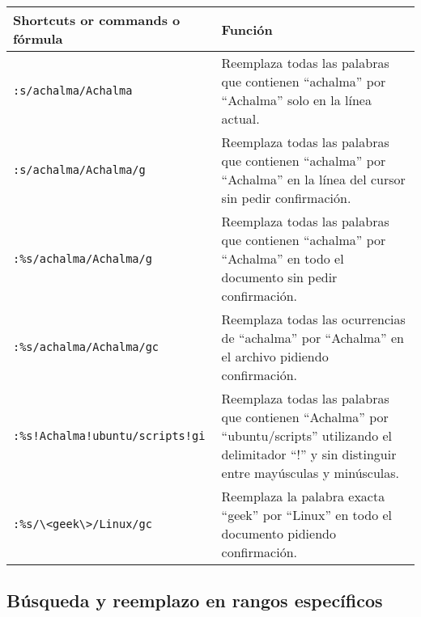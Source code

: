 \documentclass[
  doc,
  floatsintext,
  longtable,
  a4paper,
  nolmodern,
  notxfonts,
  notimes,
  colorlinks=true,linkcolor=blue,citecolor=blue,urlcolor=blue]{apa7}
\begin{document}
\begin{longtable}[]{@{}
  >{\raggedright\arraybackslash}p{}
  >{\raggedright\arraybackslash}p{}@{}}
\toprule\noalign{}
\begin{minipage}[b]{\linewidth}\raggedright
Shortcuts or commands o fórmula
\end{minipage} & \begin{minipage}[b]{\linewidth}\raggedright
Función
\end{minipage} \\
\midrule\noalign{}
\endhead
\bottomrule\noalign{}
\endlastfoot
\texttt{:s/achalma/Achalma} & Reemplaza todas las palabras que contienen
``achalma'' por ``Achalma'' solo en la línea actual. \\
\texttt{:s/achalma/Achalma/g} & Reemplaza todas las palabras que
contienen ``achalma'' por ``Achalma'' en la línea del cursor sin pedir
confirmación. \\
\texttt{:\%s/achalma/Achalma/g} & Reemplaza todas las palabras que
contienen ``achalma'' por ``Achalma'' en todo el documento sin pedir
confirmación. \\
\texttt{:\%s/achalma/Achalma/gc} & Reemplaza todas las ocurrencias de
``achalma'' por ``Achalma'' en el archivo pidiendo confirmación. \\
\texttt{:\%s!Achalma!ubuntu/scripts!gi} & Reemplaza todas las palabras
que contienen ``Achalma'' por ``ubuntu/scripts'' utilizando el
delimitador ``!'' y sin distinguir entre mayúsculas y minúsculas. \\
\texttt{:\%s/\textbackslash{}\textless{}geek\textbackslash{}\textgreater{}/Linux/gc}
& Reemplaza la palabra exacta ``geek'' por ``Linux'' en todo el
documento pidiendo confirmación. \\
\end{longtable}

\subsection{Búsqueda y reemplazo en rangos
específicos}\label{buxfasqueda-y-reemplazo-en-rangos-especuxedficos}
\end{document}
